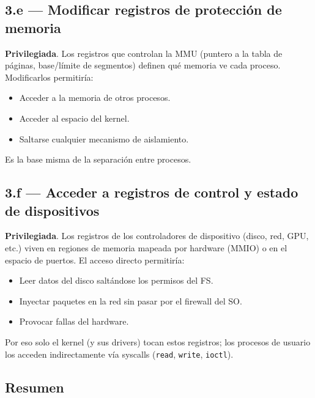 \documentclass[11pt,a4paper]{article}
\begin{document}
\subsection*{3.e --- Modificar registros de protección de memoria}

\begin{respuesta}
\textbf{Privilegiada}. Los registros que controlan la MMU (puntero
a la tabla de páginas, base/límite de segmentos) definen qué memoria
ve cada proceso. Modificarlos permitiría:

\begin{itemize}[leftmargin=*,nosep]
    \item Acceder a la memoria de otros procesos.
    \item Acceder al espacio del kernel.
    \item Saltarse cualquier mecanismo de aislamiento.
\end{itemize}

Es la base misma de la separación entre procesos.
\end{respuesta}

\subsection*{3.f --- Acceder a registros de control y estado de dispositivos}

\begin{respuesta}
\textbf{Privilegiada}. Los registros de los controladores de
dispositivo (disco, red, GPU, etc.) viven en regiones de memoria
mapeada por hardware (MMIO) o en el espacio de puertos. El acceso
directo permitiría:

\begin{itemize}[leftmargin=*,nosep]
    \item Leer datos del disco saltándose los permisos del FS.
    \item Inyectar paquetes en la red sin pasar por el firewall del
        SO.
    \item Provocar fallas del hardware.
\end{itemize}

Por eso solo el kernel (y sus drivers) tocan estos registros; los
procesos de usuario los acceden indirectamente vía syscalls
(\texttt{read}, \texttt{write}, \texttt{ioctl}).
\end{respuesta}

\subsection*{Resumen}
\end{document}

